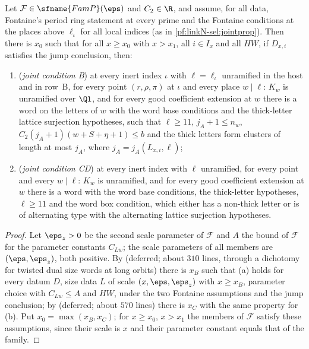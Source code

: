 \begin{theorem}\label{pf:linkN-sel:famjoints}
Let $\mathcal F\in\sfname{FamP}(\eps)$ and $C_2\in\R$, and assume, for all data, Fontaine's period ring statement at every prime and the Fontaine
conditions at the places above $\ell_\iota$ for all local indices (as in \cref{pf:linkN-sel:jointprop}). Then there is $x_0$ such that for all $x\ge x_0$ with $x>x_1$, all $i\in I_x$ and all $HW$,
if $D_{x,i}$ satisfies the jump conclusion, then:
\begin{enumerate}[label=(\alph*)]
\item (\emph{joint condition B}) at every inert index $\iota$ with $\ell=\ell_\iota$ unramified in the host and in row~B, for every point $(r,\rho,\pi)$
at $\iota$ and every place $w\mid\ell$: $K_w$ is unramified over $\Ql$, and for every good coefficient extension at $w$ there is a word on the
letters of $w$ with the word base conditions and the thick-letter lattice surjection hypotheses, such that $\ell\ge11$, $j_A+1\le n_w$,
$C_2(j_A+1)(w+S+\eta+1)\le b$ and the thick letters form clusters of length at most $j_A$, where $j_A=j_A(L_{x,i},\ell)$;
\item (\emph{joint condition CD}) at every inert index with $\ell$ unramified, for every point and every $w\mid\ell$: $K_w$ is unramified, and for
every good coefficient extension at $w$ there is a word with the word base conditions, the thick-letter hypotheses, $\ell\ge11$ and the word
box condition, which either has a non-thick letter or is of alternating type with the alternating lattice surjection hypotheses.
\end{enumerate}
\end{theorem}

\begin{proof}
Let $\eps_z>0$ be the second scale parameter of $\mathcal F$ and $A$ the bound of $\mathcal F$ for the parameter constants $C_{Lw}$; the scale
parameters of all members are $(\eps,\eps_z)$, both positive. By 
(deferred; about $310$ lines, through a dichotomy for twisted dual size words at long orbits) there is $x_B$ such that (a) holds for every datum
$D$, size data $L$ of scale $(x,\eps,\eps_z)$ with $x\ge x_B$, parameter choice with $C_{Lw}\le A$ and $HW$, under the two Fontaine
assumptions and the jump conclusion; by  (deferred; about $570$ lines) there is
$x_C$ with the same property for (b). Put $x_0=\max(x_B,x_C)$; for $x\ge x_0$, $x>x_1$ the members of $\mathcal F$ satisfy these assumptions,
since their scale is $x$ and their parameter constant equals that of the family.
\end{proof}

